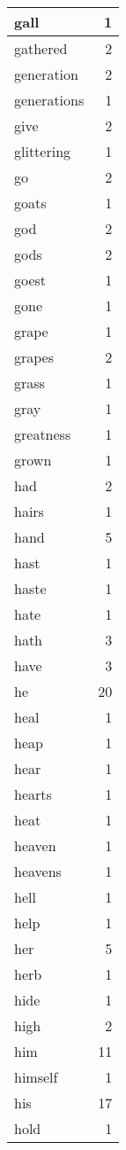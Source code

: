 \begin{center}
\begin{longtable}{l|r}
gall & 1 \\ \hline
gathered & 2 \\ \hline
generation & 2 \\ \hline
generations & 1 \\ \hline
give & 2 \\ \hline
glittering & 1 \\ \hline
go & 2 \\ \hline
goats & 1 \\ \hline
god & 2 \\ \hline
gods & 2 \\ \hline
goest & 1 \\ \hline
gone & 1 \\ \hline
grape & 1 \\ \hline
grapes & 2 \\ \hline
grass & 1 \\ \hline
gray & 1 \\ \hline
greatness & 1 \\ \hline
grown & 1 \\ \hline
had & 2 \\ \hline
hairs & 1 \\ \hline
hand & 5 \\ \hline
hast & 1 \\ \hline
haste & 1 \\ \hline
hate & 1 \\ \hline
hath & 3 \\ \hline
have & 3 \\ \hline
he & 20 \\ \hline
heal & 1 \\ \hline
heap & 1 \\ \hline
hear & 1 \\ \hline
hearts & 1 \\ \hline
heat & 1 \\ \hline
heaven & 1 \\ \hline
heavens & 1 \\ \hline
hell & 1 \\ \hline
help & 1 \\ \hline
her & 5 \\ \hline
herb & 1 \\ \hline
hide & 1 \\ \hline
high & 2 \\ \hline
him & 11 \\ \hline
himself & 1 \\ \hline
his & 17 \\ \hline
hold & 1 \\ \hline

\end{longtable}
\end{center}
